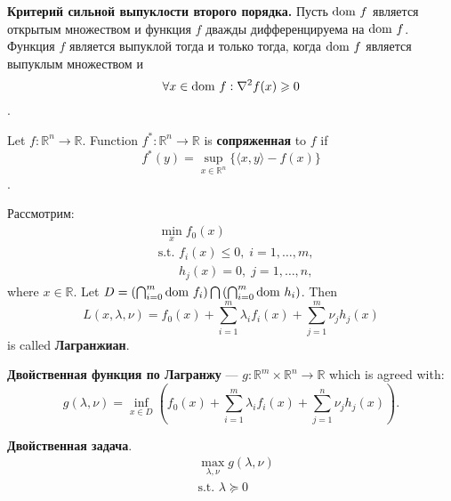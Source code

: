 \begin{theorem}
    \textnormal{\textbf{Критерий сильной выпуклости второго порядка.}}
    Пусть $\operatorname{dom \,} f$ является открытым множеством и функция $f$ дважды дифференцируема на $\operatorname{dom \,} f$.
    Функция $f$ является выпуклой тогда и только тогда, когда $\operatorname{dom \,} f$ является выпуклым множеством и
    $$\forall x \in \operatorname{dom \,} f: \nabla^2 f(x) \geqslant 0$$.
\end{theorem}

\begin{definition}
    Let $f: \mathbb{R}^n \rightarrow \mathbb{R}$.
    Function $f^*: \mathbb{R}^n \rightarrow \mathbb{R}$ is \textbf{сопряженная} to $f$ if
    $$f^*(y) = \sup\limits_{x \in \mathbb{R}^n} \{ \langle x, y\rangle - f(x)\}$$.
\end{definition}

\begin{definition}
    Рассмотрим:
    \begin{equation}
        \begin{aligned}
             & \min_{x} f_0(x)                                        \\
             & \text{s.t. } f_i(x) \leq 0, \; i = 1, \dots, m,        \\
             & \phantom{\text{s.t. }} h_j(x) = 0, \; j = 1, \dots, n,
        \end{aligned}
    \end{equation}
    where $x \in\mathbb{R}$.
    Let $D = \left(\bigcap_{i=0}^m \operatorname{dom \,} f_i\right) \bigcap \left( \bigcap_{i=0}^m \operatorname{dom \,} h_i\right)$.
    Then $$ L(x, \lambda, \nu) = f_0(x) + \sum\limits_{i=1}^m \lambda_i f_i(x) + \sum\limits_{j=1}^m \nu_j h_j(x)$$
    is called \textbf{Лагранжиан}.
\end{definition}

\begin{definition}
    \textbf{Двойственная функция по Лагранжу} --- \( g : \mathbb{R}^m \times \mathbb{R}^n \to \mathbb{R} \) which is agreed with:
    \begin{equation}
        g(\lambda, \nu) = \inf_{x \in D} \left( f_0(x) + \sum_{i=1}^m \lambda_i f_i(x) + \sum_{j=1}^n \nu_j h_j(x) \right).
    \end{equation}
\end{definition}

\begin{definition}
    \textbf{Двойственная задача}.
    \begin{equation}
        \begin{aligned}
             & \max_{\lambda, \nu} g(\lambda, \nu) \\
             & \text{s.t. } \lambda \succcurlyeq 0
        \end{aligned}
    \end{equation}
\end{definition}

